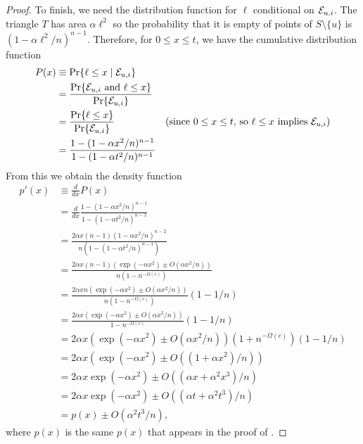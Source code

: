 \documentclass{patmorin}
\begin{document}
\begin{proof}
To finish, we need the distribution function for $\ell$ conditional on
$\mathcal{E}_{u,i}$.  The triangle $T$ has area $\alpha\ell^2$ so the probability that
it is empty of points of $S\setminus\{u\}$ is $(1-\alpha\ell^2/n)^{n-1}$.
Therefore, for $0\le x\le t$, we have the cumulative distribution function
\begin{align*}
   P(x) & \equiv \Pr\{\ell \le x\mid \mathcal{E}_{u,i}\}  \\
      & = \frac{\Pr\{\mathcal{E}_{u,i}\mbox{ and }\ell\le x\}}
               {\Pr\{\mathcal{E}_{u,i}\}} \\
      & = \frac{\Pr\{\ell\le x\}}  
               {\Pr\{\mathcal{E}_{u,i}\}} & \text{(since $0\le x\le t$, so $\ell \le x$ implies $\mathcal{E}_{u,i}$)} \\
      & = \frac{1-(1-\alpha x^2/n)^{n-1}}{1-(1-\alpha t^2/n)^{n-1}} 
\end{align*}
From this we obtain the density function
\begin{align*}
  p'(x) & \equiv \frac{d}{dx}P(x) \\
        & = \frac{d}{dx}
             \frac{1-(1-\alpha x^2/n)^{n-1}}{1-(1-\alpha t^2/n)^{n-1}} \\
        & = \frac{2\alpha x(n-1)(1-\alpha x^2/n)^{n-2}}
                  {n(1-(1-\alpha t^2/n)^{n-1})} \\
        & = \frac{2\alpha x(n-1)(\exp(-\alpha x^2)\pm O(\alpha x^2/n))}
                  {n(1-n^{-\Omega(c)})} \\
        & = \frac{2\alpha xn(\exp(-\alpha x^2)\pm O(\alpha x^2/n))}
                  {n(1-n^{-\Omega(c)})}(1-1/n) \\
        & = \frac{2\alpha x(\exp(-\alpha x^2)\pm O(\alpha x^2/n))}
                  {1-n^{-\Omega(c)}}(1-1/n) \\
        & = 2\alpha x\left(\exp(-\alpha x^2)\pm O(\alpha x^2/n)\right)
                  (1+n^{-\Omega(c)})(1-1/n) \\
        & = 2\alpha x\left(\exp(-\alpha x^2)\pm O((1+\alpha x^2)/n)\right) \\
        & = 2\alpha x\exp(-\alpha x^2)\pm O((\alpha x+\alpha^2 x^3)/n) \\
        & = 2\alpha x\exp(-\alpha x^2)\pm O((\alpha t + \alpha^2 t^3)/n) \\
        & = p(x)\pm O(\alpha^2 t^3/n) ,
\end{align*}
where $p(x)$ is the same $p(x)$ that appears in the proof of .

\end{proof}
\end{document}
